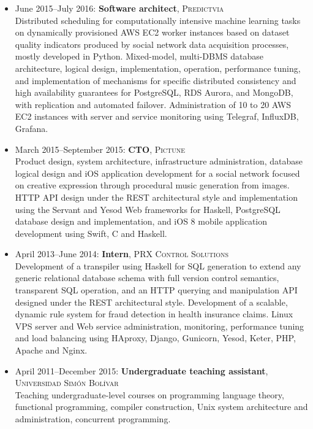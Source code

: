 \documentclass{res}
\begin{document}
\begin{resume}
\begin{itemize}[leftmargin=-0.3in]
    \item
      June 2015--July 2016: \textbf{Software architect}, \textsc{Predictvia}
      \\ \small{Distributed scheduling for computationally intensive machine learning tasks on dynamically provisioned AWS EC2 worker instances based on dataset quality indicators produced by social network data acquisition processes, mostly developed in Python.  Mixed-model, multi-DBMS database architecture, logical design, implementation, operation, performance tuning, and implementation of mechanisms for specific distributed consistency and high availability guarantees for PostgreSQL, RDS Aurora, and MongoDB, with replication and automated failover.  Administration of 10 to 20 AWS EC2 instances with server and service monitoring using Telegraf, InfluxDB, Grafana.}

    \item
      March 2015--September 2015: \textbf{CTO}, \textsc{Pictune}
      \\ \small{Product design, system architecture, infrastructure administration, database logical design and iOS application development for a social network focused on creative expression through procedural music generation from images.  HTTP API design under the REST architectural style and implementation using the Servant and Yesod Web frameworks for Haskell, PostgreSQL database design and implementation, and iOS 8 mobile application development using Swift, C and Haskell.}

    \item
      April 2013--June 2014: \textbf{Intern}, \textsc{PRX Control Solutions}
      \\ \small{Development of a transpiler using Haskell for SQL generation to extend any generic relational database schema with full version control semantics, transparent SQL operation, and an HTTP querying and manipulation API designed under the REST architectural style.  Development of a scalable, dynamic rule system for fraud detection in health insurance claims.  Linux VPS server and Web service administration, monitoring, performance tuning and load balancing using HAproxy, Django, Gunicorn, Yesod, Keter, PHP, Apache and Nginx.}


    \item
      April 2011--December 2015: \textbf{Undergraduate teaching assistant}, \textsc{Universidad Sim\'on Bol\'{\i}var}
      \\ \small{Teaching undergraduate-level courses on programming language theory, functional programming, compiler construction, Unix system architecture and administration, concurrent programming.}

  \end{itemize}

\end{resume}
\end{document}
